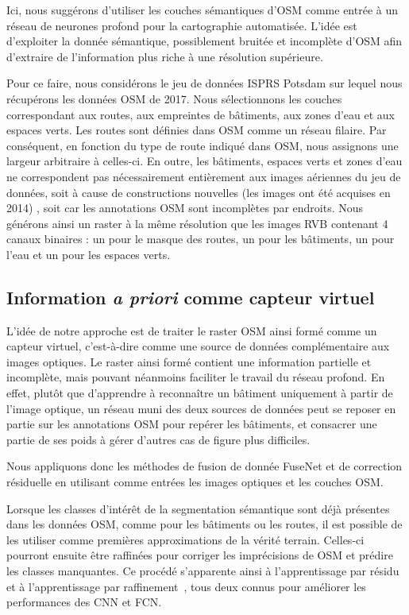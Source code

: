 Ici, nous suggérons d'utiliser les couches sémantiques d'\gls{OSM} comme entrée à un réseau de neurones profond pour la cartographie automatisée. L'idée est d'exploiter la donnée sémantique, possiblement bruitée et incomplète d'\gls{OSM} afin d'extraire de l'information plus riche à une résolution supérieure.

Pour ce faire, nous considérons le jeu de données ISPRS Potsdam sur lequel nous récupérons les données \gls{OSM} de 2017. Nous sélectionnons les couches correspondant aux routes, aux empreintes de bâtiments, aux zones d'eau et aux espaces verts. Les routes sont définies dans \gls{OSM} comme un réseau filaire. Par conséquent, en fonction du type de route indiqué dans \gls{OSM}, nous assignons une largeur arbitraire à celles-ci. En outre, les bâtiments, espaces verts et zones d'eau ne correspondent pas nécessairement entièrement aux images aériennes du jeu de données, soit à cause de constructions nouvelles (les images ont été acquises en 2014) , soit car les annotations \gls{OSM} sont incomplètes par endroits. Nous générons ainsi un raster à la même résolution que les images \gls{RVB} contenant 4 canaux binaires : un pour le masque des routes, un pour les bâtiments, un pour l'eau et un pour les espaces verts.

\subsection{Information \textit{a priori} comme capteur virtuel}

L'idée de notre approche est de traiter le raster \gls{OSM} ainsi formé comme un capteur virtuel, c'est-à-dire comme une source de données complémentaire aux images optiques. Le raster ainsi formé contient une information partielle et incomplète, mais pouvant néanmoins faciliter le travail du réseau profond. En effet, plutôt que d'apprendre à reconnaître un bâtiment uniquement à partir de l'image optique, un réseau muni des deux sources de données peut se reposer en partie sur les annotations \gls{OSM} pour repérer les bâtiments, et consacrer une partie de ses poids à gérer d'autres cas de figure plus difficiles.

Nous appliquons donc les méthodes de fusion de donnée FuseNet et de correction résiduelle en utilisant comme entrées les images optiques et les couches \gls{OSM}.

Lorsque les classes d'intérêt de la segmentation sémantique sont déjà présentes dans les données OSM, comme pour les bâtiments ou les routes, il est possible de les utiliser comme premières approximations de la vérité terrain. Celles-ci pourront ensuite être raffinées pour corriger les imprécisions de OSM et prédire les classes manquantes. Ce procédé s'apparente ainsi à l'apprentissage par résidu~\cite{he_deep_2016} et à l'apprentissage par raffinement~\cite{lin_refinenet_2016}, tous deux connus pour améliorer les performances des CNN et FCN.

